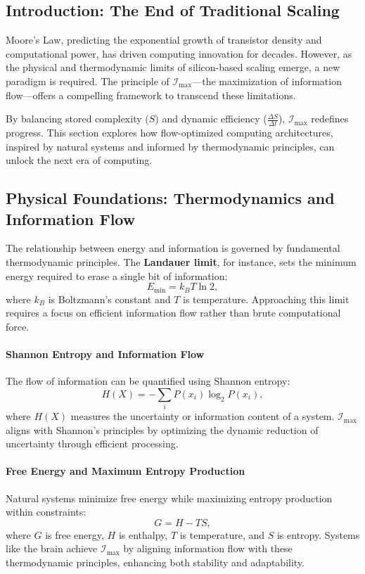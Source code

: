\documentclass[12pt]{article}
\begin{document}
\subsection{Introduction: The End of Traditional Scaling}

Moore’s Law, predicting the exponential growth of transistor density and computational power, has driven computing innovation for decades. However, as the physical and thermodynamic limits of silicon-based scaling emerge, a new paradigm is required. The principle of \(\mathcal{I}_{\text{max}}\)—the maximization of information flow—offers a compelling framework to transcend these limitations.

By balancing stored complexity (\(S\)) and dynamic efficiency (\(\frac{\Delta S}{\Delta t}\)), \(\mathcal{I}_{\text{max}}\) redefines progress. This section explores how flow-optimized computing architectures, inspired by natural systems and informed by thermodynamic principles, can unlock the next era of computing.

\subsection{Physical Foundations: Thermodynamics and Information Flow}

The relationship between energy and information is governed by fundamental thermodynamic principles. The \textbf{Landauer limit}, for instance, sets the minimum energy required to erase a single bit of information:
\[
E_{\text{min}} = k_B T \ln 2,
\]
where \(k_B\) is Boltzmann’s constant and \(T\) is temperature. Approaching this limit requires a focus on efficient information flow rather than brute computational force.

\paragraph{Shannon Entropy and Information Flow}
The flow of information can be quantified using Shannon entropy:
\[
H(X) = -\sum_{i} P(x_i) \log_2 P(x_i),
\]
where \(H(X)\) measures the uncertainty or information content of a system. \(\mathcal{I}_{\text{max}}\) aligns with Shannon’s principles by optimizing the dynamic reduction of uncertainty through efficient processing.

\paragraph{Free Energy and Maximum Entropy Production}
Natural systems minimize free energy while maximizing entropy production within constraints:
\[
G = H - TS,
\]
where \(G\) is free energy, \(H\) is enthalpy, \(T\) is temperature, and \(S\) is entropy. Systems like the brain achieve \(\mathcal{I}_{\text{max}}\) by aligning information flow with these thermodynamic principles, enhancing both stability and adaptability.
\end{document}
